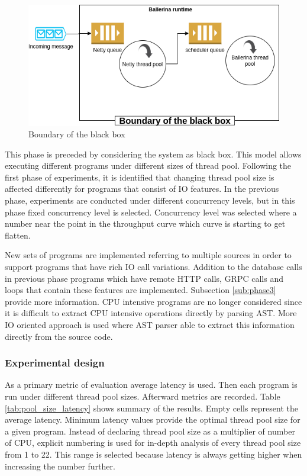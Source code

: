 
\begin{figure}[htbp]
	\begin{center}
		\includegraphics[scale=0.5]{figures/black_box_boundary.png}
	\end{center}
	\caption{Boundary of the black box}
	\label{black_box_boundary}
\end{figure}


This phase is preceded by considering the system as black box. This model allows executing different programs under different sizes of thread pool. Following the first phase of experiments, it is identified that changing thread pool size is affected differently for programs that consist of IO features. In the previous phase, experiments are conducted under different concurrency levels, but in this phase fixed concurrency level is selected. Concurrency level was selected where a number near the point in the throughput curve which curve is starting to get flatten.

New sets of programs are implemented referring to multiple sources \cite{Ballerina_Performance,Ballerina_Website} in order to support programs that have rich IO call variations. Addition to the database calls in previous phase programs which have remote HTTP calls, GRPC calls and loops that contain these features are implemented. Subsection \ref{sub:phase3} provide more information. CPU intensive programs are no longer considered since it is difficult to extract CPU intensive operations directly by parsing AST. More IO oriented approach is used where AST parser able to extract this information directly from the source code.  
	
\subsubsection{Experimental design} 

As a primary metric of evaluation average latency is used. Then each program is run under different thread pool sizes. Afterward metrics are recorded. Table \ref{tab:pool_size_latency} shows summary of the results. Empty cells represent the average latency. Minimum latency values provide the optimal thread pool size for a given program. Instead of declaring thread pool size as a multiplier of number of CPU, explicit numbering is used for in-depth analysis of every thread pool size from 1 to 22. This range is selected because latency is always getting higher when increasing the number further.  

